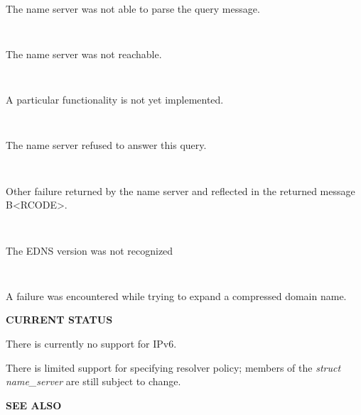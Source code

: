 \begin{description}
\item {}\verb" "

The name server was not able to parse the query message.

\item {}\verb" "

The name server was not reachable.

\item {}\verb" "

A particular functionality is not yet implemented.

\item {}\verb" "

The name server refused to answer this query.

\item {}\verb" "

Other failure returned by the name server and reflected in the
returned message B<RCODE>.

\item {}\verb" "

The EDNS version was not recognized

\item {}\verb" "

A failure was encountered while trying to expand a compressed domain name.

\end{description}

{\bf CURRENT STATUS}

There is currently no support for IPv6.

There is limited support for specifying resolver policy; members of the
{\it struct name\_server} are still subject to change.

{\bf SEE ALSO}

